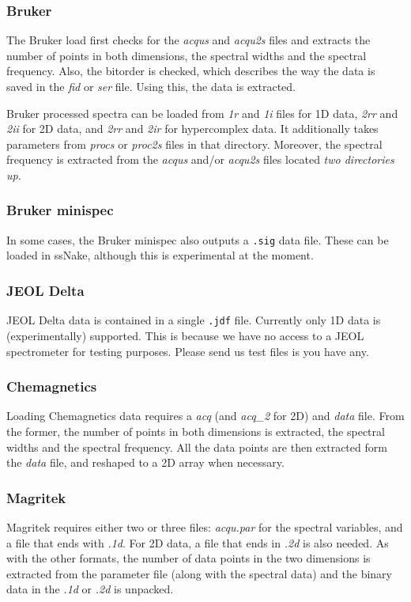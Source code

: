 \documentclass[11pt,a4paper]{article}
\begin{document}
\subsubsection*{Bruker}
The Bruker load first checks for the \textit{acqus} and \textit{acqu2s} files and extracts the number of points in both dimensions, the spectral widths and the spectral frequency. Also, the bitorder is checked, which describes the way the data is saved in the \textit{fid} or \textit{ser} file. Using this, the data is extracted.

Bruker processed spectra can be loaded from \textit{1r} and \textit{1i} files for 1D data, \textit{2rr} and \textit{2ii} for 2D data, and \textit{2rr} and \textit{2ir} for hypercomplex data. It additionally takes parameters from \textit{procs} or \textit{proc2s} files in that directory. Moreover, the spectral frequency is extracted from the \textit{acqus} and/or \textit{acqu2s} files located \textit{two directories up}.

\subsubsection*{Bruker minispec}
In some cases, the Bruker minispec also outputs a \texttt{.sig} data file. These can be loaded in ssNake, although this is experimental at the moment.

\subsubsection*{JEOL Delta}
JEOL Delta data is contained in a single \texttt{.jdf} file. Currently only 1D data is (experimentally) supported. This is because we have no access to a JEOL spectrometer for testing purposes. Please send us test files is you have any.

\subsubsection*{Chemagnetics}
Loading Chemagnetics data requires a \textit{acq} (and \textit{acq\_2} for 2D) and \textit{data} file. From the former, the number of points in both dimensions is extracted, the spectral widths and the spectral frequency. All the data points are then extracted form the \textit{data} file, and reshaped to a 2D array when necessary.

\subsubsection*{Magritek}
Magritek requires either two or three files: \textit{acqu.par} for the spectral variables, and a file that ends with \textit{.1d}. For 2D data, a file that ends in \textit{.2d} is also needed. As with the other formats, the number of data points in the two dimensions is extracted from the parameter file (along with the spectral data) and the binary data in the \textit{.1d} or \textit{.2d} is unpacked.
\end{document}
